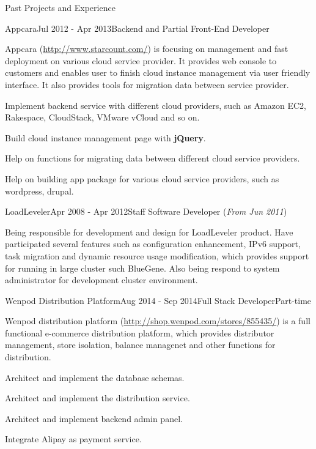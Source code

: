 \documentclass{resume} %
\newcommand{\http}{http:/\hspace{-0.3ex}/}
\begin{document}
\begin{rSection}{Past Projects and Experience}
\begin{rSubsection}{Appcara}{Jul 2012 - Apr 2013}{Backend and Partial Front-End Developer}{}

Appcara (\href{http://www.starcount.com/}{\http{}www.starcount.com/}) is focusing on management and fast deployment on various cloud service provider. It provides web console to customers and enables user to finish cloud instance management via user friendly interface. It also provides tools for migration data between service provider. 

\begin{rSubsectionList}
\item Implement backend service with different cloud providers, such as Amazon EC2, Rakespace, CloudStack, VMware vCloud and so on.
\item Build cloud instance management page with \textbf{jQuery}.
\item Help on functions for migrating data between different cloud service providers.
\item Help on building app package for various cloud service providers, such as wordpress, drupal.
\end{rSubsectionList}
\end{rSubsection}



\begin{rSubsection}{LoadLeveler}{Apr 2008 - Apr 2012}{Staff Software Developer (\textit{From Jun 2011})}{}

Being responsible for development and design for LoadLeveler product. Have participated several features such as configuration enhancement, IPv6 support, task migration and dynamic resource usage modification, which provides support for running in large cluster such BlueGene. Also being respond to system administrator for development cluster environment.

\end{rSubsection}



\begin{rSubsection}{Wenpod Distribution Platform}{Aug 2014 - Sep 2014}{Full Stack Developer}{Part-time}

Wenpod distribution platform (\href{http://shop.wenpod.com/stores/855435/}{\http{}shop.wenpod.com/stores/855435/}) is a full functional e-commerce distribution platform, which provides distributor management, store isolation, balance managenet and other functions for distribution.

\begin{rSubsectionList}
\item Architect and implement the database schemas.
\item Architect and implement the distribution service.
\item Architect and implement backend admin panel.
\item Integrate Alipay as payment service.
\end{rSubsectionList}
\end{rSubsection}




\end{rSection}
\end{document}

